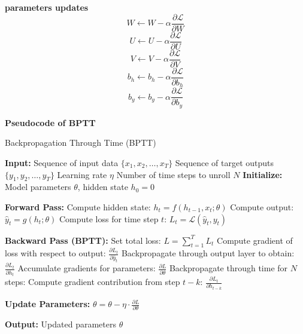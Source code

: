 \documentclass[12pt,a4paper]{article}
\begin{document}
\textbf{parameters updates}
\begin{equation}
    W \leftarrow W - \alpha\dfrac{\partial\mathcal{L}}{\partial W}
\end{equation}
\begin{equation}
    U \leftarrow U - \alpha\dfrac{\partial\mathcal{L}}{\partial U}
\end{equation}
\begin{equation}
    V \leftarrow V - \alpha\dfrac{\partial\mathcal{L}}{\partial V}
\end{equation}
\begin{equation}
    b_h \leftarrow b_h - \alpha\dfrac{\partial\mathcal{L}}{\partial b_h}
\end{equation}
\begin{equation}
    b_y \leftarrow b_y - \alpha\dfrac{\partial\mathcal{L}}{\partial b_y}
\end{equation}

\newpage
\textbf{Pseudocode of BPTT} \parencite{wikipedia2023bptt}
\begin{algorithm}[H]
    \caption{Backpropagation Through Time (BPTT)}
    \begin{algorithmic}[1]
    \STATE \textbf{Input:} 
    \STATE \hspace{1em} Sequence of input data $\{x_1, x_2, \dots, x_T\}$
    \STATE \hspace{1em} Sequence of target outputs $\{y_1, y_2, \dots, y_T\}$
    \STATE \hspace{1em} Learning rate $\eta$
    \STATE \hspace{1em} Number of time steps to unroll $N$
    \STATE \textbf{Initialize:} Model parameters $\theta$, hidden state $h_0 = 0$
    
    \STATE \textbf{Forward Pass:}
        \STATE Compute hidden state: $h_t = f(h_{t-1}, x_t; \theta)$
        \STATE Compute output: $\hat{y}_t = g(h_t; \theta)$
        \STATE Compute loss for time step $t$: $L_t = \mathcal{L}(\hat{y}_t, y_t)$
    \ENDFOR
    
    \STATE \textbf{Backward Pass (BPTT):}
    \STATE Set total loss: $L = \sum_{t=1}^{T} L_t$
        \STATE Compute gradient of loss with respect to output: $\frac{\partial L_t}{\partial \hat{y}_t}$
        \STATE Backpropagate through output layer to obtain: $\frac{\partial L_t}{\partial h_t}$
        \STATE Accumulate gradients for parameters: $\frac{\partial L}{\partial \theta}$
            \STATE Backpropagate through time for $N$ steps:
            \STATE Compute gradient contribution from step $t-k$: $\frac{\partial L_t}{\partial h_{t-k}}$
        \ENDFOR
    \ENDFOR
    
    \STATE \textbf{Update Parameters:}
    \STATE $\theta = \theta - \eta \cdot \frac{\partial L}{\partial \theta}$
    
    \STATE \textbf{Output:} Updated parameters $\theta$
    \end{algorithmic}
\end{algorithm}
\end{document}
